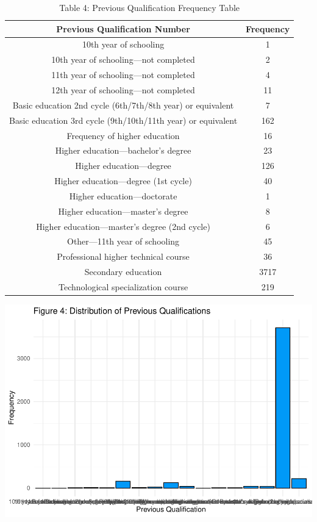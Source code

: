 \documentclass[
]{article}
\begin{document}
\begin{table}

\caption{\label{tab:unnamed-chunk-9}Table 4: Previous Qualification Frequency Table}
\centering
\begin{tabular}[t]{c|c}
\hline
Previous Qualification Number & Frequency\\
\hline
10th year of schooling & 1\\
\hline
10th year of schooling—not completed & 2\\
\hline
11th year of schooling—not completed & 4\\
\hline
12th year of schooling—not completed & 11\\
\hline
Basic education 2nd cycle (6th/7th/8th year) or equivalent & 7\\
\hline
Basic education 3rd cycle (9th/10th/11th year) or equivalent & 162\\
\hline
Frequency of higher education & 16\\
\hline
Higher education—bachelor’s degree & 23\\
\hline
Higher education—degree & 126\\
\hline
Higher education—degree (1st cycle) & 40\\
\hline
Higher education—doctorate & 1\\
\hline
Higher education—master’s degree & 8\\
\hline
Higher education—master’s degree (2nd cycle) & 6\\
\hline
Other—11th year of schooling & 45\\
\hline
Professional higher technical course & 36\\
\hline
Secondary education & 3717\\
\hline
Technological specialization course & 219\\
\hline
\end{tabular}
\end{table}

\begin{center}\includegraphics{finalproj_files/figure-latex/unnamed-chunk-9-1} \end{center}
\end{document}
